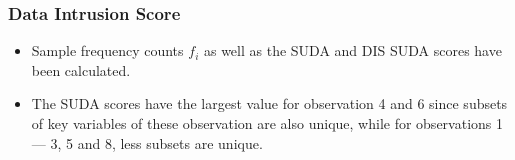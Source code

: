 \documentclass{beamer}
\begin{document}
	\begin{frame}
		\frametitle{Data Intrusion Score}
		\begin{itemize} 			
			\item Sample frequency
			counts $f_i$ as well as the SUDA and DIS SUDA scores have been calculated. 
			\item The
			SUDA scores have the largest value for observation 4 and 6 since subsets of key
			variables of these observation are also unique, while for observations 1 — 3, 5 and
			8, less subsets are unique.
		\end{itemize}
	\end{frame}
	
\end{document}
